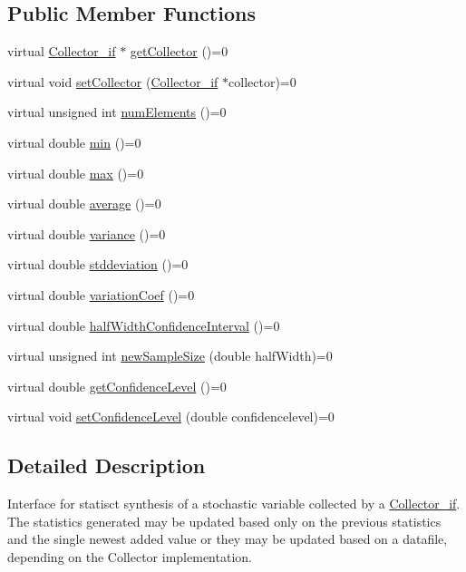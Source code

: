 \subsection*{Public Member Functions}
\begin{DoxyCompactItemize}
\item 
virtual \hyperlink{class_collector__if}{Collector\+\_\+if} $\ast$ \hyperlink{class_statistics__if_a49a730541ca9a3d8272f39f4000485c4}{get\+Collector} ()=0
\item 
virtual void \hyperlink{class_statistics__if_a203ffe8e5215e887b716b7810023adc6}{set\+Collector} (\hyperlink{class_collector__if}{Collector\+\_\+if} $\ast$collector)=0
\item 
virtual unsigned int \hyperlink{class_statistics__if_a1e76d98f8a61fe03df9e36194eaa5722}{num\+Elements} ()=0
\item 
virtual double \hyperlink{class_statistics__if_acdeb9880a7362e9105871c7fb3f65db6}{min} ()=0
\item 
virtual double \hyperlink{class_statistics__if_a24e3652122f2ec649b4c7d3accc43da0}{max} ()=0
\item 
virtual double \hyperlink{class_statistics__if_a791ab6bbd166254429a3131bdf6e8dd6}{average} ()=0
\item 
virtual double \hyperlink{class_statistics__if_a1b563f7e92eda3cf3a8f47f07824b96b}{variance} ()=0
\item 
virtual double \hyperlink{class_statistics__if_a88d2478c6dfd8de19436ab248080a509}{stddeviation} ()=0
\item 
virtual double \hyperlink{class_statistics__if_ae0ad6bf18f8263003b0ac7552318be57}{variation\+Coef} ()=0
\item 
virtual double \hyperlink{class_statistics__if_a5d4ab727b54825cb55b3b9bd00b4b88d}{half\+Width\+Confidence\+Interval} ()=0
\item 
virtual unsigned int \hyperlink{class_statistics__if_a926ff99efcecb3609918b70e495057fd}{new\+Sample\+Size} (double half\+Width)=0
\item 
virtual double \hyperlink{class_statistics__if_a1533540d1977c62b0024d6d571a994d9}{get\+Confidence\+Level} ()=0
\item 
virtual void \hyperlink{class_statistics__if_af40ee46b5ea90979439edc6aa26179c8}{set\+Confidence\+Level} (double confidencelevel)=0
\end{DoxyCompactItemize}


\subsection{Detailed Description}
Interface for statisct synthesis of a stochastic variable collected by a \hyperlink{class_collector__if}{Collector\+\_\+if}. The statistics generated may be updated based only on the previous statistics and the single newest added value or they may be updated based on a datafile, depending on the Collector implementation. 

